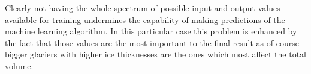 Clearly not having the whole spectrum of possible input and output values available for training undermines the capability of making predictions of the machine learning algorithm. In this particular case this problem is enhanced by the fact that those values are the most important to the final result as of course bigger glaciers with higher ice thicknesses are the ones which most affect the total volume. 


%
%
%
